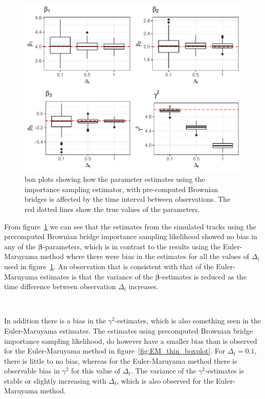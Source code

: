 \begin{figure}[H]
    \centering
    \includegraphics[width=\linewidth]{Images/Results/varying dt estimates precomputed BB.pdf}
    \caption[Box plots of Parameter Estimates using pre-computed Brownian bridge importance sampling at different sampling intervals]{box plots showing how the parameter estimates using the importance sampling estimator, with pre-computed Brownian bridges is affected by the time interval between observations. The red dotted lines show the true values of the parameters.}
    \label{fig:varying dt boxplot precomputed BB}
\end{figure}


From figure~\ref{fig:varying dt boxplot precomputed BB} we can see that the estimates from the simulated tracks using the precomputed Brownian bridge importance sampling likelihood showed no bias in any of the $\bm \beta$-parameters, which is in contrast to the results using the Euler-Maruyama method where there were bias in the estimates for all the values of $\Delta_t$ used in figure~\ref{fig:varying dt boxplot precomputed BB}. An observation that is consistent with that of the Euler-Maruyama estimates is that the variance of the $\bm \beta$-estimates is reduced as the time difference between observation $\Delta_t$ increases. 

\

In addition there is a bias in the $\gamma^2$-estimates, which is also something seen in the Euler-Maruyama estimates. The estimates using precomputed Brownian bridge importance sampling likelihood, do however have a smaller bias than is observed for the Euler-Maruyama method in figure~\ref{fig:EM_thin_boxplot}. For $\Delta_t=0.1$, there is little to no bias, whereas for the Euler-Maruyama method there is observable bias in $\gamma^2$ for this value of $\Delta_t$. The variance of the $\gamma^2$-estimates is stable or slightly increasing with $\Delta_t$, which is also observed for the Euler-Maruyama method.




